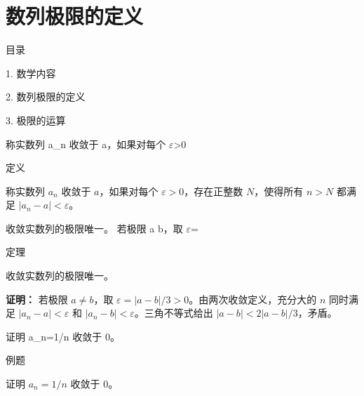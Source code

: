 \documentclass[aspectratio=169,10pt,fontset=fandol]{ctexbeamer}
\makeatletter
\newcommand{\mathagentsectionlabelcontext}{%
\protected@edef\@currentlabel{\thesection}%
\edef\@currentHref{Outline\the\c@part.\the\c@section}%
}
\makeatother
\begin{document}
\section{数列极限的定义}
\begin{frame}[t,fragile]{目录}
\normalsize
{\color{black}\normalsize 1. 数学内容\par}\vspace{0.22em}
{\color{blue}\normalsize 2. 数列极限的定义\par}\vspace{0.22em}
{\color{gray!40}\normalsize 3. 极限的运算\par}\vspace{0.22em}
\end{frame}
\begin{frame}[t,fragile]{称实数列 a\_n 收敛于 a，如果对每个 \texorpdfstring{\ensuremath{\varepsilon}}{ε}>0}
\normalsize
{\normalsize
\mathagentsectionlabelcontext
\label{sec:S01}

}
\begin{block}{定义}
{\normalsize
称实数列 $a_n$ 收敛于 $a$，如果对每个 $\varepsilon>0$，存在正整数 $N$，使得所有 $n>N$ 都满足 $|a_n-a|<\varepsilon$。

}
\end{block}
\end{frame}
\begin{frame}[t,fragile]{收敛实数列的极限唯一。 若极限 a b，取 \texorpdfstring{\ensuremath{\varepsilon}}{ε}=}
\normalsize
\begin{block}{定理}
{\normalsize
收敛实数列的极限唯一。

}
\end{block}
\pause
{\normalsize
\textbf{证明：}
若极限 $a\ne b$，取 $\varepsilon=|a-b|/3>0$。由两次收敛定义，充分大的 $n$ 同时满足 $|a_n-a|<\varepsilon$ 和 $|a_n-b|<\varepsilon$。三角不等式给出 $|a-b|<2|a-b|/3$，矛盾。

}
\end{frame}
\begin{frame}[t,fragile]{证明 a\_n=1/n 收敛于 0。}
\normalsize
\begin{block}{例题}
{\normalsize
证明 $a_n=1/n$ 收敛于 $0$。

}
\end{block}
\end{frame}
\end{document}
